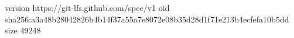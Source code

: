 version https://git-lfs.github.com/spec/v1
oid sha256:a3a48b28042826b4b14f37a55a7e8072e08b35d28d1f71e213b4ecfefa10b5dd
size 49248
